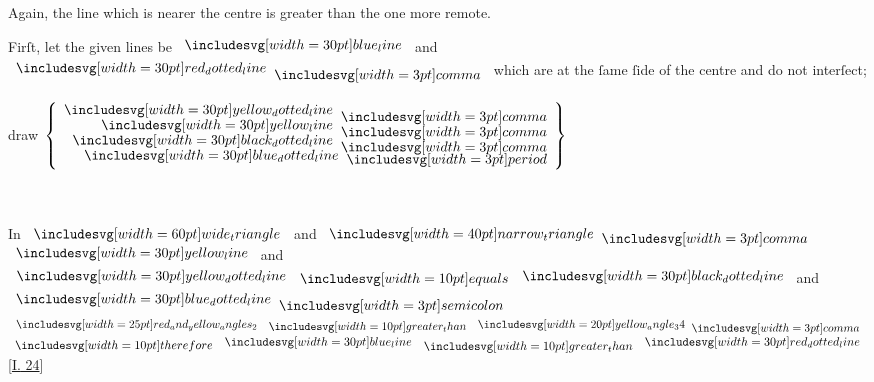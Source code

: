 \documentclass[12pt,preview]{standalone}
\begin{document}
\begin{minipage}[t]{0.64\textwidth}
    \hfill

    \begin{center}
        Again, the line which is nearer the centre is greater than the one more remote.
    \end{center}

    \hfill

    \begin{center}
        Firſt, let the given lines be $\blueline$ and $\dottedredline \bcomma$ which are at the ſame ſide of the centre and do not interſect;\\
        \hfill\\
        draw $\left\{\begin{aligned}\dottedyellowline \bcomma \\[-2ex] \yellowline \bcomma \\[-2ex] \dottedblackline \bcomma \\[-2ex] \dottedblueline \bperiod \end{aligned}\right\}$\\
        \hfill\\
        \hfill\\
    \end{center}

\end{minipage}%

\newpage

\begin{minipage}[t]{0.64\textwidth}
    \vspace{0pt}

    \begin{center}
        In $\img[0][0][60]{wide_triangle}$ and $\img[0][0][40]{narrow_triangle} \bcomma$\\
        $\yellowline$ and $\dottedyellowline \bequals \dottedblackline$ and $\dottedblueline \bsemicolon$\\
        $\img{red_and_yellow_angles_2} \bgt \img[0][0][20]{yellow_angle_34} \bcomma$\\
        $\btherefore \blueline \bgt \dottedredline$ [\hyperref[book1pr24]{\textsc{I.} 24}]
    \end{center}
\end{minipage}

\hfill
\end{document}
